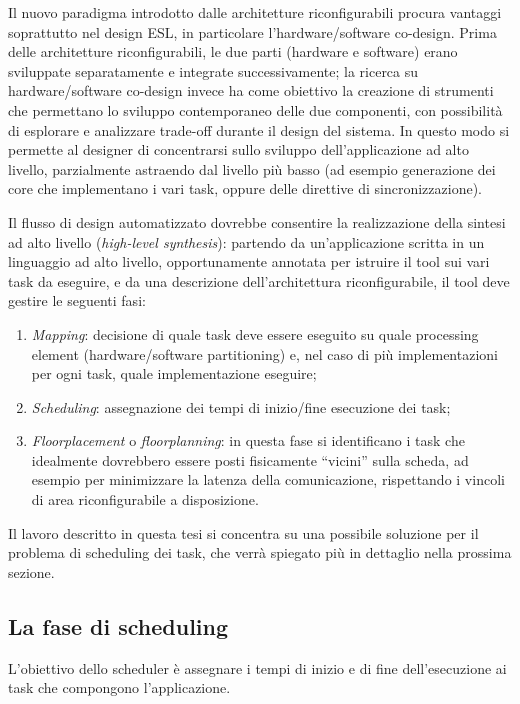 Il nuovo paradigma introdotto dalle architetture riconfigurabili procura vantaggi
soprattutto nel design \ac{ESL}, in particolare l'\mbox{hardware/software} co-design.
Prima delle architetture riconfigurabili, le due parti (hardware e software) erano
sviluppate separatamente e integrate successivamente; la ricerca su 
\mbox{hardware/software} co-design invece ha come obiettivo la creazione di strumenti che 
permettano lo sviluppo contemporaneo delle due componenti, con possibilità di esplorare e 
analizzare trade-off durante il design del sistema. In questo modo si permette al 
designer di concentrarsi sullo sviluppo dell'applicazione ad alto livello, parzialmente 
astraendo dal livello più basso (ad esempio generazione dei core che implementano i vari 
task, oppure delle direttive di sincronizzazione).

Il flusso di design automatizzato dovrebbe consentire la realizzazione della sintesi ad 
alto livello (\emph{high-level synthesis}): partendo da un'applicazione scritta in un
linguaggio ad alto livello, opportunamente annotata per istruire il tool sui vari task
da eseguire, e da una descrizione dell'architettura riconfigurabile, il tool deve gestire
le seguenti fasi:
\begin{enumerate}
 \item \emph{Mapping}: decisione di quale task deve essere eseguito su quale processing 
element  (\mbox{hardware/software} partitioning) e, nel caso di più implementazioni per 
ogni task, quale implementazione eseguire;
 \item \emph{Scheduling}: assegnazione dei tempi di inizio/fine esecuzione dei task;
 \item \emph{Floorplacement} o \emph{floorplanning}: in questa fase si identificano i 
task che idealmente dovrebbero essere posti fisicamente ``vicini'' sulla scheda, ad 
esempio per minimizzare la latenza della comunicazione, rispettando i vincoli di area 
riconfigurabile a disposizione.
\end{enumerate}

Il lavoro descritto in questa tesi si concentra su una possibile soluzione per il 
problema di scheduling dei task, che verrà spiegato più in dettaglio nella prossima 
sezione.


\subsection{La fase di scheduling}
L'obiettivo dello scheduler è assegnare i tempi di inizio e di fine dell'esecuzione ai
task che compongono l'applicazione.

